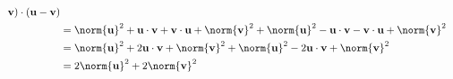 \documentclass[a4paper,table]{report}
\begin{document}
\begin{enumerate}[start=9]
\begin{solution}
\begin{enumerate}[i)]
\begin{align*}
            \mathbf{v}) \cdot (\mathbf{u}- \mathbf{v}) \\ 
            &=
            \norm{\mathbf{u}}^{2} + \mathbf{u} \cdot \mathbf{v} + \mathbf{v}
            \cdot \mathbf{u} +
            \norm{\mathbf{v}}^{2} + \norm{\mathbf{u}}^{2} - \mathbf{u} \cdot  
            \mathbf{v} - \mathbf{v} \cdot \mathbf{u} +  \norm{\mathbf{v}}^{2} \\
            &=
            \norm{\mathbf{u}}^{2} + 2 \mathbf{u} \cdot \mathbf{v} +
            \norm{\mathbf{v}}^{2} + \norm{\mathbf{u}}^{2} - 2 \mathbf{u}
            \cdot \mathbf{v} + \norm{\mathbf{v}}^{2} \\ 
            &= 2 \norm{\mathbf{u}}^{2} + 2 \norm{\mathbf{v}}^{2}
          \end{align*}
      \end{enumerate}
    \end{solution}


\end{enumerate}
\end{document}
